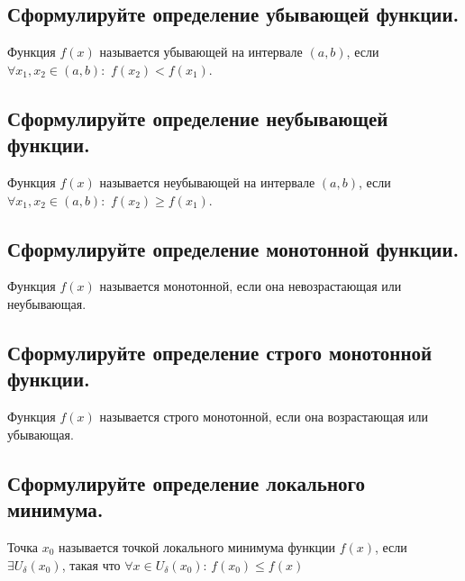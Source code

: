 
\subsection{Сформулируйте определение убывающей функции.}

Функция $f(x)$ называется убывающей на интервале $(a, b)$, если $\forall x_1, x_2 \in (a, b):$ $f(x_2)<f(x_1)$.



\subsection{Сформулируйте определение неубывающей функции.}

Функция $f(x)$ называется неубывающей на интервале $(a, b)$, если $\forall x_1, x_2 \in (a, b):$ $f(x_2) \geqslant f(x_1)$.



\subsection{Сформулируйте определение монотонной функции.}

Функция $f(x)$ называется монотонной, если она невозрастающая или неубывающая.



\subsection{Сформулируйте определение строго монотонной функции.}

Функция $f(x)$ называется строго монотонной, если она возрастающая или убывающая.



\subsection{Сформулируйте определение локального минимума.}

Точка $x_0$ называется точкой локального минимума функции $f(x)$, если $\exists U_{\delta}(x_0)$, такая что $\forall x \in U_{\delta}(x_0)$: $f(x_0) \leqslant f(x)$

